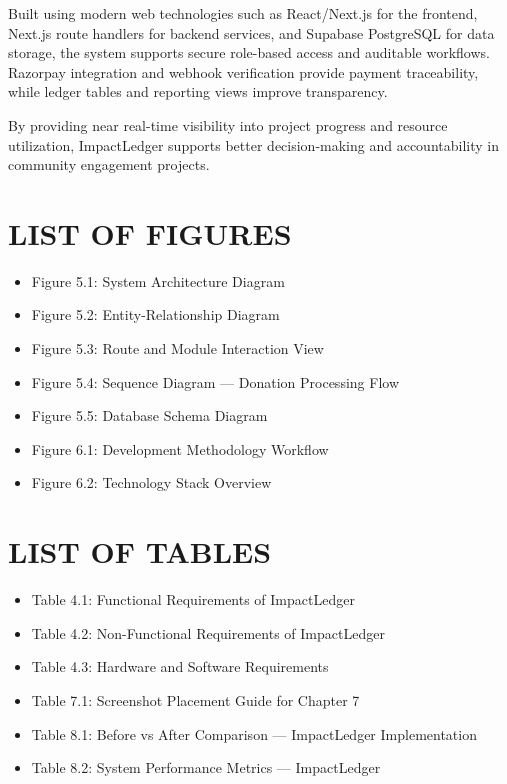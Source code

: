 \documentclass[12pt,a4paper]{article}
\begin{document}
Built using modern web technologies such as React/Next.js for the frontend, Next.js route handlers for backend services, and Supabase PostgreSQL for data storage, the system supports secure role-based access and auditable workflows. Razorpay integration and webhook verification provide payment traceability, while ledger tables and reporting views improve transparency.

By providing near real-time visibility into project progress and resource utilization, ImpactLedger supports better decision-making and accountability in community engagement projects.

\newpage
\tableofcontents
\vspace{1cm}

\section{LIST OF FIGURES}
\begin{itemize}
	\item Figure 5.1: System Architecture Diagram
	\item Figure 5.2: Entity-Relationship Diagram
	\item Figure 5.3: Route and Module Interaction View
	\item Figure 5.4: Sequence Diagram --- Donation Processing Flow
	\item Figure 5.5: Database Schema Diagram
	\item Figure 6.1: Development Methodology Workflow
	\item Figure 6.2: Technology Stack Overview
\end{itemize}

\section{LIST OF TABLES}
\begin{itemize}
	\item Table 4.1: Functional Requirements of ImpactLedger
	\item Table 4.2: Non-Functional Requirements of ImpactLedger
	\item Table 4.3: Hardware and Software Requirements
	\item Table 7.1: Screenshot Placement Guide for Chapter 7
	\item Table 8.1: Before vs After Comparison --- ImpactLedger Implementation
	\item Table 8.2: System Performance Metrics --- ImpactLedger
\end{itemize}
\end{document}
